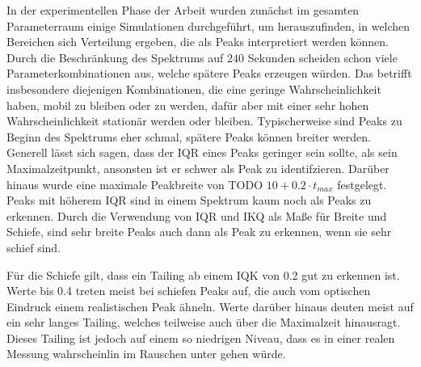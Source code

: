 In der experimentellen Phase der Arbeit wurden zunächst im gesamten Parameterraum %
einige Simulationen durchgeführt, um herauszufinden, in welchen Bereichen sich Verteilung ergeben, die als Peaks interpretiert werden können. 
Durch die Beschränkung des Spektrums auf $240$ Sekunden scheiden schon viele Parameterkombinationen aus, welche spätere Peaks erzeugen würden. Das betrifft insbesondere diejenigen Kombinationen, die eine geringe Wahrscheinlichkeit haben, mobil zu bleiben oder zu werden, dafür aber mit einer sehr hohen Wahrscheinlichkeit stationär werden oder bleiben. 
Typischerweise sind Peaks zu Beginn des Spektrums eher schmal, spätere Peaks können breiter werden. 
Generell lässt sich sagen, dass der IQR eines Peaks geringer sein sollte, als sein Maximalzeitpunkt, ansonsten ist er schwer als Peak zu identifzieren. Darüber hinaus wurde eine maximale Peakbreite von TODO $10+0.2\cdot t_{max}$  festgelegt. Peaks mit höherem IQR sind in einem Spektrum kaum noch als Peaks zu erkennen.
Durch die Verwendung von IQR und IKQ als Maße für Breite und Schiefe, sind sehr breite Peaks auch dann als Peak zu erkennen, wenn sie sehr schief sind.

Für die Schiefe gilt, dass ein Tailing ab einem IQK von 0.2 gut zu erkennen ist. Werte bis 0.4 treten meist bei schiefen Peaks auf, die auch vom optischen Eindruck einem realistischen Peak ähneln. Werte darüber hinaus deuten meist auf ein sehr langes Tailing, welches teilweise auch über die Maximalzeit hinausragt. Dieses Tailing ist jedoch auf einem so niedrigen Niveau, dass es in einer realen Messung wahrscheinlin im Rauschen unter gehen würde.

